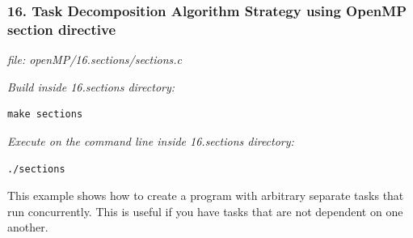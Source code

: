 \documentclass[letterpaper,10pt,openany,oneside]{sphinxmanual}
\begin{document}
\subsubsection{16. Task Decomposition Algorithm Strategy using OpenMP section directive}
\label{SharedMemory/TaskDecomp:task-decomposition-algorithm-strategy-using-openmp-section-directive}
\emph{file: openMP/16.sections/sections.c}

\emph{Build inside 16.sections directory:}

\begin{Verbatim}[commandchars=\\\{\}]
make sections
\end{Verbatim}

\emph{Execute on the command line inside 16.sections directory:}

\begin{Verbatim}[commandchars=\\\{\}]
./sections
\end{Verbatim}

This example shows how to create a program with arbitrary separate tasks that run concurrently.  This is useful if you have tasks that are not dependent on one another.
\end{document}
